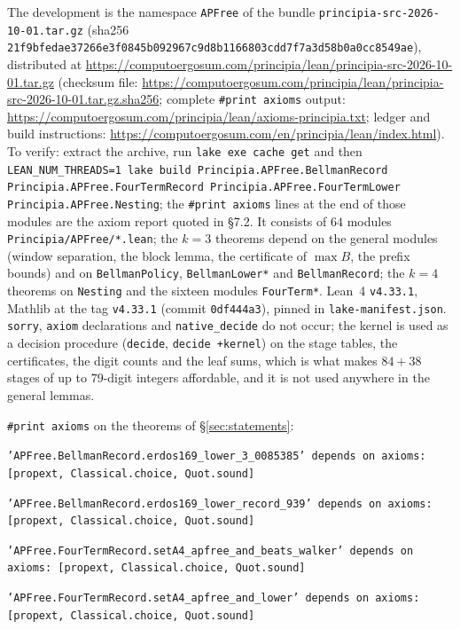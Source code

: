 \documentclass[11pt,a4paper]{article}
\theoremstyle{definition}
\theoremstyle{remark}
\newcommand{\Blk}{B}
\newcommand{\code}[1]{\texttt{#1}}
\begin{document}
The development is the namespace \code{APFree} of the bundle \code{principia-src-2026-10-01.tar.gz} (sha256 \code{21f9bfed\allowbreak{}ae37266e\allowbreak{}3f0845b0\allowbreak{}92967c9d\allowbreak{}8b116680\allowbreak{}3cdd7f7a\allowbreak{}3d58b0a0\allowbreak{}cc8549ae}), distributed at \url{https://computoergosum.com/principia/lean/principia-src-2026-10-01.tar.gz} (checksum file: \url{https://computoergosum.com/principia/lean/principia-src-2026-10-01.tar.gz.sha256}; complete \code{\#print axioms} output: \url{https://computoergosum.com/principia/lean/axioms-principia.txt}; ledger and build instructions: \url{https://computoergosum.com/en/principia/lean/index.html}). To verify: extract the archive, run \code{lake exe cache get} and then \code{LEAN\_NUM\_THREADS=1 lake build Principia.APFree.BellmanRecord Principia.APFree.FourTermRecord Principia.APFree.FourTermLower Principia.APFree.Nesting}; the \code{\#print axioms} lines at the end of those modules are the axiom report quoted in \S7.2. It consists of $64$ modules \code{Principia/APFree/*.lean}; the $k=3$ theorems depend on the general modules (window separation, the block lemma, the certificate of $\max\Blk$, the prefix bounds) and on \code{BellmanPolicy}, \code{BellmanLower*} and \code{BellmanRecord}; the $k=4$ theorems on \code{Nesting} and the sixteen modules \code{FourTerm*}. Lean~4 \code{v4.33.1}, Mathlib at the tag \code{v4.33.1} (commit \code{0df444a3}), pinned in \code{lake-manifest.json}. \code{sorry}, \code{axiom} declarations and \code{native\_decide} do not occur; the kernel is used as a decision procedure (\code{decide}, \code{decide +kernel}) on the stage tables, the certificates, the digit counts and the leaf sums, which is what makes $84 + 38$ stages of up to $79$-digit integers affordable, and it is not used anywhere in the general lemmas.

\code{\#print axioms} on the theorems of \S\ref{sec:statements}:

\begin{leancode}
\item \code{'APFree.\allowbreak{}BellmanRecord.\allowbreak{}erdos169\_\allowbreak{}lower\_\allowbreak{}3\_\allowbreak{}0085385' depends on axioms: [propext, Classical.\allowbreak{}choice, Quot.\allowbreak{}sound]}
\item \code{'APFree.\allowbreak{}BellmanRecord.\allowbreak{}erdos169\_\allowbreak{}lower\_\allowbreak{}record\_\allowbreak{}939' depends on axioms: [propext, Classical.\allowbreak{}choice, Quot.\allowbreak{}sound]}
\item \code{'APFree.\allowbreak{}FourTermRecord.\allowbreak{}setA4\_\allowbreak{}apfree\_\allowbreak{}and\_\allowbreak{}beats\_\allowbreak{}walker' depends on axioms: [propext, Classical.\allowbreak{}choice, Quot.\allowbreak{}sound]}
\item \code{'APFree.\allowbreak{}FourTermRecord.\allowbreak{}setA4\_\allowbreak{}apfree\_\allowbreak{}and\_\allowbreak{}lower' depends on axioms: [propext, Classical.\allowbreak{}choice, Quot.\allowbreak{}sound]}
\end{leancode}
\end{document}
